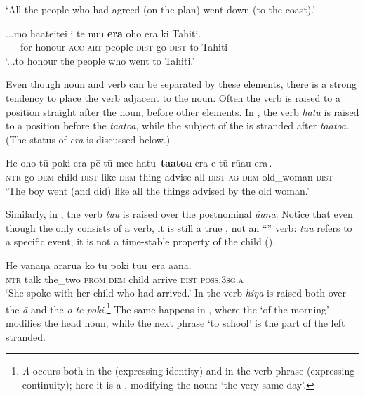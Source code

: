 \glt 
‘All the people who had agreed (on the plan) went down (to the coast).’ \textstyleExampleref{[R250.233]} 
\z

\ea\label{ex:11.134}
\gll ...mo ha{\ꞌ}ateitei i te nu{\ꞌ}u \textbf{era} oho era ki Tahiti. \\
~~~for honour \textsc{acc} \textsc{art} people \textsc{dist} go \textsc{dist} to Tahiti \\

\glt 
‘...to honour the people who went to Tahiti.’ \textstyleExampleref{[R202.003]} 
\z

Even though noun and verb can be separated by these  elements, there is a strong tendency to place the verb adjacent to the noun. Often the verb is raised to a position straight after the noun, before other  elements. In , the verb \textit{hatu} is raised to a position before the  \textit{ta{\ꞌ}ato{\ꞌ}a}, while the subject of the  is stranded after \textit{ta{\ꞌ}ato{\ꞌ}a}. (The status of \textit{era} is discussed below.)

\ea\label{ex:11.135}
\gll He oho tū poki era pē tū me{\ꞌ}e {\ob}hatu\,{\cb} \textbf{ta{\ꞌ}ato{\ꞌ}a} era {\ob}e tū rū{\ꞌ}au era\,{\cb}.\\
\textsc{ntr} go \textsc{dem} child \textsc{dist} like \textsc{dem} thing {\db}advise all \textsc{dist} {\db}\textsc{ag} \textsc{dem} old\_woman \textsc{dist}\\

\glt
‘The boy went (and did) like all the things advised by the old woman.’ \textstyleExampleref{[R310.105]} 
\z

Similarly, in , the verb \textit{tu{\ꞌ}u} is raised over the postnominal  \textit{\mbox{{\ꞌ}ā{\ꞌ}ana}}. Notice that even though the  only consists of a verb, it is still a true , not an “” verb: \textit{tu{\ꞌ}u} refers to a specific event, it is not a time-stable property of the child ().

\ea\label{ex:11.136}
\gll He vānaŋa ararua ko tū poki {\ob}tu{\ꞌ}u\,{\cb} era {\ꞌ}ā{\ꞌ}ana. \\
\textsc{ntr} talk the\_two \textsc{prom} \textsc{dem} child {\db}arrive \textsc{dist} \textsc{poss.3sg.a} \\

\glt
‘She spoke with her child who had arrived.’ \textstyleExampleref{[R532-01.007]}
\z
{}
In  the verb \textit{hiŋa} is raised both over the  \textit{{\ꞌ}ā} and the  \textit{o te poki}.\footnote{\label{fn:518}\textit{{\ꞌ}Ā} occurs both in the  (expressing identity) and in the verb phrase (expressing continuity); here it is a  , modifying the noun: ‘the very same day’.} The same happens in , where the  ‘of the morning’ modifies the head noun, while the next phrase ‘to school’ is the part of the  left stranded.

